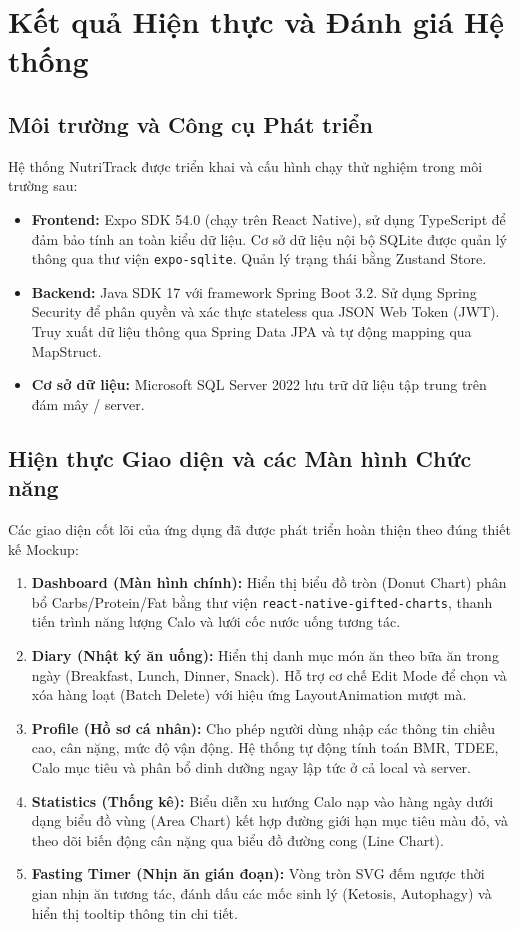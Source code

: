 \documentclass[12pt,a4paper]{article}
\begin{document}
\section{Kết quả Hiện thực và Đánh giá Hệ thống}

\subsection{Môi trường và Công cụ Phát triển}

Hệ thống NutriTrack được triển khai và cấu hình chạy thử nghiệm trong môi trường sau:
\begin{itemize}
    \item \textbf{Frontend:} Expo SDK 54.0 (chạy trên React Native), sử dụng TypeScript để đảm bảo tính an toàn kiểu dữ liệu. Cơ sở dữ liệu nội bộ SQLite được quản lý thông qua thư viện \texttt{expo-sqlite}. Quản lý trạng thái bằng Zustand Store.
    \item \textbf{Backend:} Java SDK 17 với framework Spring Boot 3.2. Sử dụng Spring Security để phân quyền và xác thực stateless qua JSON Web Token (JWT). Truy xuất dữ liệu thông qua Spring Data JPA và tự động mapping qua MapStruct.
    \item \textbf{Cơ sở dữ liệu:} Microsoft SQL Server 2022 lưu trữ dữ liệu tập trung trên đám mây / server.
\end{itemize}

\subsection{Hiện thực Giao diện và các Màn hình Chức năng}

Các giao diện cốt lõi của ứng dụng đã được phát triển hoàn thiện theo đúng thiết kế Mockup:
\begin{enumerate}
    \item \textbf{Dashboard (Màn hình chính):} Hiển thị biểu đồ tròn (Donut Chart) phân bổ Carbs/Protein/Fat bằng thư viện \texttt{react-native-gifted-charts}, thanh tiến trình năng lượng Calo và lưới cốc nước uống tương tác.
    \item \textbf{Diary (Nhật ký ăn uống):} Hiển thị danh mục món ăn theo bữa ăn trong ngày (Breakfast, Lunch, Dinner, Snack). Hỗ trợ cơ chế Edit Mode để chọn và xóa hàng loạt (Batch Delete) với hiệu ứng LayoutAnimation mượt mà.
    \item \textbf{Profile (Hồ sơ cá nhân):} Cho phép người dùng nhập các thông tin chiều cao, cân nặng, mức độ vận động. Hệ thống tự động tính toán BMR, TDEE, Calo mục tiêu và phân bổ dinh dưỡng ngay lập tức ở cả local và server.
    \item \textbf{Statistics (Thống kê):} Biểu diễn xu hướng Calo nạp vào hàng ngày dưới dạng biểu đồ vùng (Area Chart) kết hợp đường giới hạn mục tiêu màu đỏ, và theo dõi biến động cân nặng qua biểu đồ đường cong (Line Chart).
    \item \textbf{Fasting Timer (Nhịn ăn gián đoạn):} Vòng tròn SVG đếm ngược thời gian nhịn ăn tương tác, đánh dấu các mốc sinh lý (Ketosis, Autophagy) và hiển thị tooltip thông tin chi tiết.
\end{enumerate}
\end{document}
